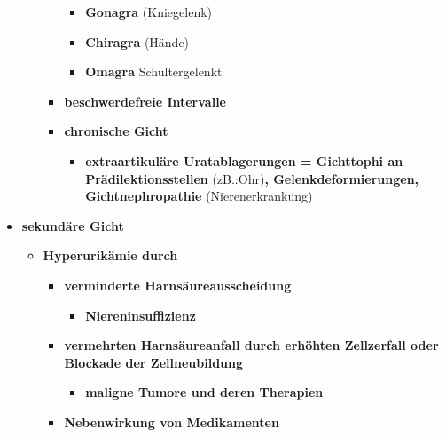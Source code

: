 \begin{itemize}
\begin{itemize}
\begin{itemize}
\begin{itemize}
								\item \textbf{Gonagra} (Kniegelenk)
								\item \textbf{Chiragra} (Hände)
								\item \textbf{Omagra} Schultergelenkt
							\end{itemize}
						\item \textbf{beschwerdefreie Intervalle}
						\item \textbf{chronische Gicht}
							\begin{itemize}
								\item \textbf{extraartikuläre Uratablagerungen = Gichttophi an Prädilektionsstellen} (zB.:Ohr)\textbf{, Gelenkdeformierungen, Gichtnephropathie} (Nierenerkrankung)
							\end{itemize}
					\end{itemize}								
			\end{itemize}
		\item \textbf{sekundäre Gicht}
			\begin{itemize}
				\item \textbf{Hyperurikämie durch}
					\begin{itemize}
						\item \textbf{verminderte Harnsäureausscheidung}
							\begin{itemize}
								\item \textbf{Niereninsuffizienz}
							\end{itemize}
						\item \textbf{vermehrten Harnsäureanfall durch erhöhten Zellzerfall oder Blockade der Zellneubildung}
							\begin{itemize}
								\item \textbf{maligne Tumore und deren Therapien}
							\end{itemize}
						\item \textbf{Nebenwirkung von Medikamenten}
					\end{itemize}
			\end{itemize}
	\end{itemize}
	
